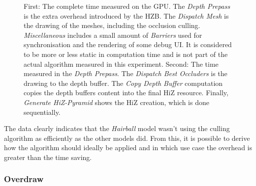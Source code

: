 \begin{figure}[!htb]
  \caption{First: The complete time measured on the \ac{GPU}. The \emph{Depth Prepass} is the extra overhead 
  introduced by the \ac{HZB}. The \emph{Dispatch Mesh} is the drawing of the meshes, including the occlusion 
  culling. \emph{Miscellaneous} includes a small amount of \emph{Barriers} used for synchronisation and the 
  rendering of some debug \ac{UI}. It is considered to be more or less static in computation time and is not 
  part of the actual algorithm measured in this experiment. Second: The time measured in the \emph{Depth Prepass}. 
  The \emph{Dispatch Best Occluders} is the drawing to the depth buffer. The \emph{Copy Depth Buffer} computation 
  copies the depth buffers content into the final \ac{HiZ} resource. Finally, \emph{Generate HiZ-Pyramid} shows 
  the \ac{HiZ} creation, which is done sequentially.}
  \label{fig:hairball-gpu-times}
\end{figure}

\noindent
The data clearly indicates that the \emph{Hairball} model wasn't using the culling algorithm as efficiently as 
the other models did. From this, it is possible to derive how the algorithm should ideally be applied and in 
which use case the overhead is greater than the time saving.

\subsubsection*{Overdraw}

